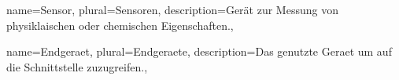 \makenoidxglossaries
{}
{
	name=Sensor,
	plural=Sensoren,
	description={Gerät zur Messung von physiklaischen oder chemischen Eigenschaften.},
}

 {
	name=Endgeraet,
	plural=Endgeraete,
    description={Das genutzte Geraet um auf die Schnittstelle zuzugreifen.},
}

